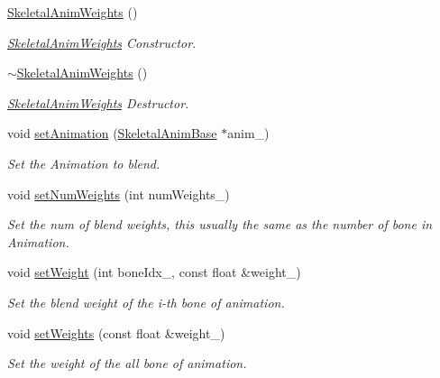 \begin{DoxyCompactItemize}
\item 
\hyperlink{class_magnum_1_1_skeletal_anim_weights_ad297f1b52de6b67f3547a4700cada65b}{Skeletal\+Anim\+Weights} ()
\begin{DoxyCompactList}\small\item\em \hyperlink{class_magnum_1_1_skeletal_anim_weights}{Skeletal\+Anim\+Weights} Constructor. \end{DoxyCompactList}\item 
\hyperlink{class_magnum_1_1_skeletal_anim_weights_ad1d2cf6299b9c4e9cd24b2611fc49a3b}{$\sim$\+Skeletal\+Anim\+Weights} ()
\begin{DoxyCompactList}\small\item\em \hyperlink{class_magnum_1_1_skeletal_anim_weights}{Skeletal\+Anim\+Weights} Destructor. \end{DoxyCompactList}\item 
void \hyperlink{class_magnum_1_1_skeletal_anim_weights_acf543d1c9d22b95b3c541990fa24af4f}{set\+Animation} (\hyperlink{class_magnum_1_1_skeletal_anim_base}{Skeletal\+Anim\+Base} $\ast$anim\+\_\+)
\begin{DoxyCompactList}\small\item\em Set the Animation to blend. \end{DoxyCompactList}\item 
void \hyperlink{class_magnum_1_1_skeletal_anim_weights_ae5324bf6dc58ecf310bdb31174d2a21e}{set\+Num\+Weights} (int num\+Weights\+\_\+)
\begin{DoxyCompactList}\small\item\em Set the num of blend weights, this usually the same as the number of bone in Animation. \end{DoxyCompactList}\item 
void \hyperlink{class_magnum_1_1_skeletal_anim_weights_a8d8093ac23fb9eca419351af2886b186}{set\+Weight} (int bone\+Idx\+\_\+, const float \&weight\+\_\+)
\begin{DoxyCompactList}\small\item\em Set the blend weight of the i-\/th bone of animation. \end{DoxyCompactList}\item 
void \hyperlink{class_magnum_1_1_skeletal_anim_weights_a2b3c92b93523ecc42483644362ed2a5b}{set\+Weights} (const float \&weight\+\_\+)
\begin{DoxyCompactList}\small\item\em Set the weight of the all bone of animation. \end{DoxyCompactList}\item 

\end{DoxyCompactItemize}
